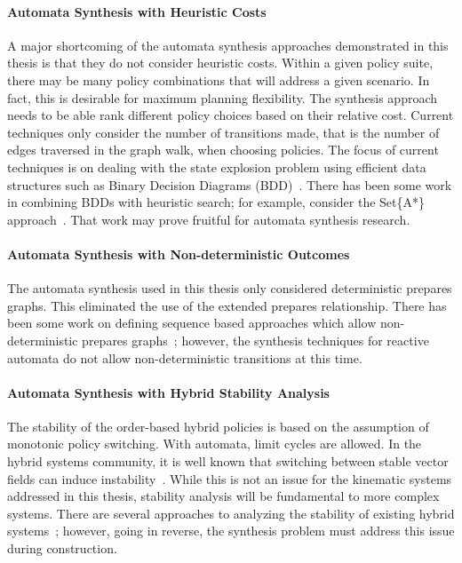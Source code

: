 \paragraph{Automata Synthesis with Heuristic Costs}
A major shortcoming of the automata synthesis approaches demonstrated in this thesis
is that they do not consider heuristic costs.  Within a given policy suite, there may
be many policy combinations that will address a given scenario.  In fact, this is
desirable for maximum planning flexibility.  The synthesis approach needs to be able
rank different policy choices based on their relative cost.  Current techniques only
consider the number of transitions made, that is the number of edges traversed in the
graph walk, when choosing policies.  The focus of current techniques is on dealing
with the state explosion problem using efficient data structures such as Binary
Decision Diagrams (BDD)~\cite{Bryant_86,clarke_99}.  There has been some work in
combining BDDs with heuristic search; for example, consider the Set\{A*\}
approach~\cite{jensen_02}.  That work may prove fruitful for automata synthesis
research.

\paragraph{Automata Synthesis with Non-deterministic Outcomes}
The automata synthesis used in this thesis only considered deterministic prepares
graphs.  This eliminated the use of the extended prepares relationship.  There has
been some work on defining sequence based approaches which allow non-deterministic
prepares graphs~\cite{kloetzer_07}; however, the synthesis techniques for reactive
automata do not allow non-deterministic transitions at this time.

\paragraph{Automata Synthesis with Hybrid Stability Analysis}
The stability of the order-based hybrid policies is based on the assumption of
monotonic policy switching.  With automata, limit cycles are allowed.  In the hybrid
systems community, it is well known that switching between stable vector fields can
induce instability~\cite{Branicky:98b,decarlo_00,liberzon_99}.  While this is not an
issue for the kinematic systems addressed in this thesis, stability analysis will be
fundamental to more complex systems.  There are several approaches to analyzing the
stability of existing hybrid systems~\cite{Branicky:98b,decarlo_00,liberzon_99};
however, going in reverse, the synthesis problem must address this issue during
construction.

